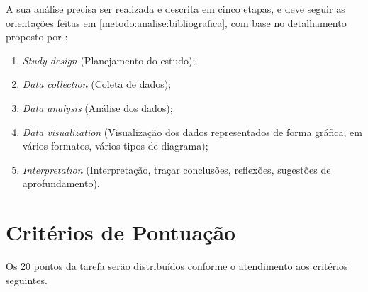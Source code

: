 A sua análise precisa ser realizada e descrita em cinco etapas, e deve seguir as orientações feitas em \ref{metodo:analise:bibliografica}, com base no detalhamento proposto por \citet{aria_bibliometrix_2017}:
\begin{enumerate}
    \item \textit{Study design} (Planejamento do estudo);

    \item  \textit{Data collection} (Coleta de dados);

    \item \textit{Data analysis} (Análise dos dados);

    \item \textit{Data visualization} (Visualização dos dados representados de forma gráfica, em vários formatos, vários tipos de diagrama);

    \item  \textit{Interpretation} (Interpretação, traçar conclusões, reflexões, sugestões de aprofundamento).
\end{enumerate}

\section{Critérios de Pontuação\label{sec:tarefa:analise:biblio:pontuacao}}

Os 20 pontos da tarefa serão distribuídos conforme o atendimento aos critérios seguintes.

